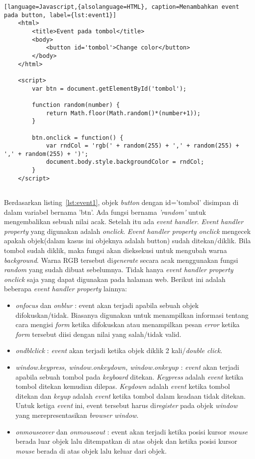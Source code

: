 \begin{lstlisting}[language=Javascript,{alsolanguage=HTML}, caption=Menambahkan event pada button, label={lst:event1}]
	<html>
		<title>Event pada tombol</title>
		<body>
			<button id='tombol'>Change color</button>
		</body>
	</html>
	
	<script>
		var btn = document.getElementById('tombol');

		function random(number) {
  			return Math.floor(Math.random()*(number+1));
		}

		btn.onclick = function() {
  			var rndCol = 'rgb(' + random(255) + ',' + random(255) + ',' + random(255) + ')';
  			document.body.style.backgroundColor = rndCol;
		}
	</script>
	
\end{lstlisting}

Berdasarkan listing~\ref{lst:event1}, objek \textit{button} dengan id='tombol' disimpan di dalam variabel bernama 'btn'. Ada fungsi bernama \textit{'random'} untuk mengembalikan sebuah nilai acak. Setelah itu ada \textit{event handler}. \textit{Event handler property} yang digunakan adalah \textit{onclick}. \textit{Event handler property onclick} mengecek apakah objek(dalam kasus ini objeknya adalah button) sudah ditekan/diklik. Bila tombol sudah diklik, maka fungsi akan dieksekusi untuk mengubah warna \textit{background}. Warna RGB tersebut di\textit{generate} secara acak menggunakan fungsi \textit{random} yang sudah dibuat sebelumnya. Tidak hanya \textit{event handler property onclick} saja yang dapat digunakan pada halaman web. Berikut ini adalah beberapa \textit{event handler property} lainnya:

\begin{itemize}
	\item \textit{onfocus} dan \textit{onblur} : event akan terjadi apabila sebuah objek difokuskan/tidak. Biasanya digunakan untuk menampilkan informasi tentang cara mengisi \textit{form} ketika difokuskan atau menampilkan pesan \textit{error} ketika \textit{form} tersebut diisi dengan nilai yang salah/tidak valid.
	\item \textit{ondblclick} : \textit{event} akan terjadi ketika objek diklik 2 kali/\textit{double click}.
	\item \textit{window.keypress, window.onkeydown, window.onkeyup} : \textit{event} akan terjadi apabila sebuah tombol pada \textit{keyboard} ditekan. \textit{Keypress} adalah \textit{event} ketika tombol ditekan kemudian dilepas. \textit{Keydown} adalah \textit{event} ketika tombol ditekan dan \textit{keyup} adalah \textit{event} ketika tombol dalam keadaan tidak ditekan. Untuk ketiga \textit{event} ini, event tersebut harus di\textit{register} pada objek \textit{window} yang merepresentasikan \textit{browser window}.
	\item \textit{onmouseover} dan \textit{onmouseout} : event akan terjadi ketika posisi kursor \textit{mouse} berada luar objek lalu ditempatkan di atas objek dan ketika posisi kursor \textit{mouse} berada di atas objek lalu keluar dari objek. 
\end{itemize}

